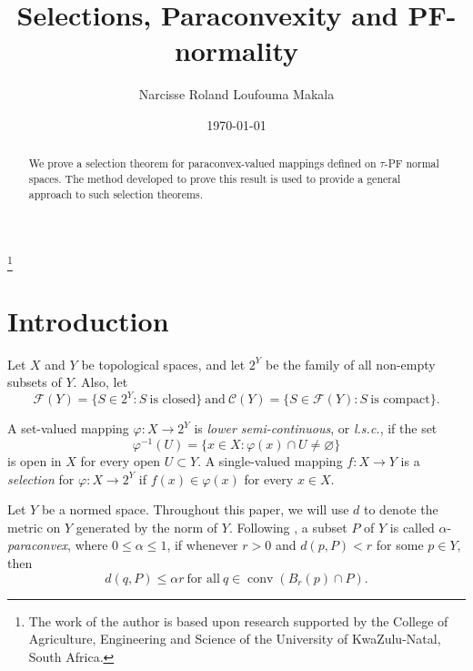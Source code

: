 \documentclass[12pt,a4paper,fleqn,leqno]{amsart}
\theoremstyle{plain}
\theoremstyle{definition}
\numberwithin{equation}{section}
\begin{document}
\title{Selections, Paraconvexity and PF-normality}

\thanks{The work of the author is based upon research supported by the
College of Agriculture, Engineering and Science of the University of KwaZulu-Natal, South Africa.}

\author{Narcisse Roland Loufouma Makala}

\address{School of Mathematics, Statistics and Computer Science, University of
KwaZulu-Natal,   Westville Campus, Private Bag X54001, Durban 4000, South Africa}




\begin{abstract}
We prove a selection theorem for paraconvex-valued mappings defined on $\tau$-PF normal spaces. The method developed to prove this result is used to provide a general approach
to such selection theorems.
\end{abstract}

\date{\today}
\maketitle

\section{Introduction}
\label{section1}

Let $X$ and $Y$ be topological spaces, and let $2^Y$ be the family of all non-empty subsets of $Y$. Also, let
\[
\mathscr{F}(Y)=\{S\in 2^Y:S\ \text{is closed}\}\ \text{and}\ \mathscr{C}(Y)=\{S\in \mathscr{F}(Y):S\ \text{is compact}\}.
\]

A set-valued mapping $\varphi:X\to 2^Y$ is \emph{lower semi-continuous}, or \emph{l.s.c.}, if the set
\[
\varphi^{-1}(U)=\{x\in X: \varphi(x)\cap U\neq {\varnothing}\}
\]
is open in $X$ for every open $U\subset Y$. A single-valued mapping $f:X\to Y$ is a \emph{selection} for $\varphi:X\to 2^Y$ if $f(x)\in \varphi(x)$ for every $x\in X$.\medskip

Let $Y$ be a normed space. Throughout this paper, we will use $d$ to denote the metric on $Y$ generated by the norm of $Y$. Following \cite{michael2}, a subset $P$ of $Y$ is called
$\alpha$-\emph{paraconvex}, where $0\leq\alpha\leq1$, if whenever $r>0$ and $d(p,P)<r$ for some $p\in Y$, then
\[
d(q,P)\leq\alpha r\ \text{for all}\ q\in\operatorname{conv}(B_r(p)\cap P).
\]
\end{document}
